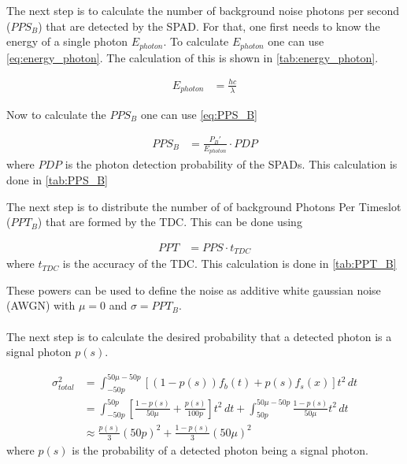 

The next step is to calculate the number of background noise photons per second ($PPS_B$) that are detected by the SPAD. For that, one first needs to know the energy of a single photon $E_{photon}$. To calculate $E_{photon}$ one can use \cref{eq:energy_photon}. The calculation of this is shown in \cref{tab:energy_photon}.

\begin{align}\label{eq:energy_photon}
	E_{photon} &= \frac{hc}{\lambda}
\end{align}



Now to calculate the $PPS_B$ one can use \cref{eq:PPS_B}

\begin{align}\label{eq:PPS_B}
	PPS_B &= \frac{P_B'}{E_{photon}}\cdot PDP
\end{align}
where $PDP$ is the photon detection probability of the SPADs. This calculation is done in \cref{tab:PPS_B}



The next step is to distribute the number of of background Photons Per Timeslot ($PPT_B$) that are formed by the TDC. This can be done using 

\begin{align}\label{eq:PPT_B}
	PPT &= PPS\cdot t_{TDC}
\end{align}
where $t_{TDC}$ is the accuracy of the TDC. This calculation is done in \cref{tab:PPT_B}



These powers can be used to define the noise as additive white gaussian noise (AWGN) with $\mu = 0$ and $\sigma = PPT_B$. \\
\\
The next step is to calculate the desired probability that a detected photon is a signal photon $p(s)$. 

\begin{align}
	\sigma_{total}^2 &= \int_{-50p}^{50\mu - 50p}[(1-p(s))f_b(t)+p(s)f_s(x)]t^2\,dt \\
	            &= \int_{-50p}^{50p}[\frac{1-p(s)}{50\mu}+\frac{p(s)}{100p}]t^2\,dt + \int_{50p}^{50 \mu-50p}\frac{1-p(s)}{50\mu}t^2\,dt\\
	            &\approx  \frac{p(s)}{3}(50p)^2 + \frac{1-p(s)}{3}(50\mu)^2
\end{align}
where $p(s)$ is the probability of a detected photon being a signal photon. 

